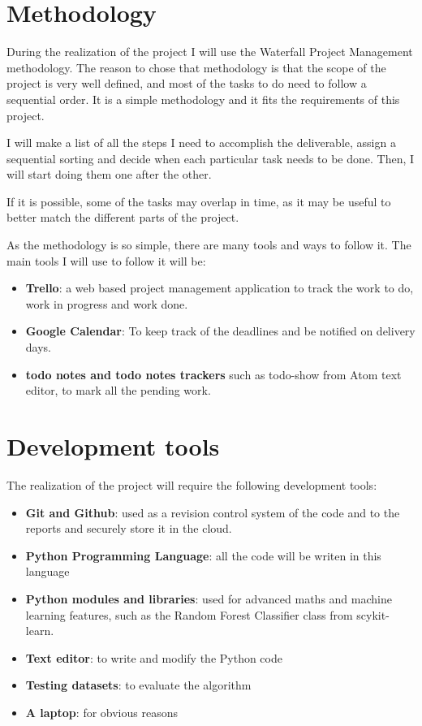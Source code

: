 \documentclass[a4paper]{article}
\begin{document}
    \section{Methodology}

    During the realization of the project I will use the Waterfall Project Management methodology. The reason to chose that methodology is that the scope of the project is very well defined, and most of the tasks to do need to follow a sequential order. It is a simple methodology and it fits the requirements of this project.

    I will make a list of all the steps I need to accomplish the deliverable, assign a sequential sorting and decide when each particular task needs to be done. Then, I will start doing them one after the other.

    If it is possible, some of the tasks may overlap in time, as it may be useful to better match the different parts of the project.

    As the methodology is so simple, there are many tools and ways to follow it. The main tools I will use to follow it will be:
    \begin{itemize}
        \item \textbf{Trello}: a web based project management application to track the work to do, work in progress and work done.
        \item \textbf{Google Calendar}: To keep track of the deadlines and be notified on delivery days.
        \item \textbf{todo notes and todo notes trackers} such as todo-show from Atom text editor, to mark all the pending work.
    \end{itemize}

    \section{Development tools}

    The realization of the project will require the following development tools:

    \begin{itemize}
        \item \textbf{Git and Github}: used as a revision control system of the code and to the reports and securely store it in the cloud.
        \item \textbf{Python Programming Language}: all the code will be writen in this language
        \item \textbf{Python modules and libraries}: used for advanced maths and machine learning features, such as the Random Forest Classifier class from scykit-learn.
        \item \textbf{Text editor}: to write and modify the Python code
        \item \textbf{Testing datasets}: to evaluate the algorithm
        \item \textbf{A laptop}: for obvious reasons
    \end{itemize}
\end{document}
